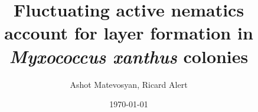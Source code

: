 \newenvironment{openissue}[1][Open]{%
  \setbeamercolor{block title alerted}{fg=white,bg=issuecolor}%
  \setbeamercolor{block body alerted}{fg=black,bg=issuecolor!10}%
  \setbeamerfont{itemize/enumerate body}{size=\small}%
  \setbeamerfont{itemize/enumerate subbody}{size=\footnotesize}%
  \begin{alertblock}{\small #1}\small}{\end{alertblock}}

\newenvironment{keyresult}[1][Key point]{%
  \setbeamercolor{block title example}{fg=white,bg=keycolor}%
  \setbeamercolor{block body example}{fg=black,bg=keycolor!8}%
  \begin{exampleblock}{\small #1}}{\end{exampleblock}}

\newcommand{\src}[1]{\gdef\framesrc{#1}}
\newcommand{\bridge}[1]{\par\vfill\hfill{\small\color{keycolor}\itshape$\rightarrow$~#1}\par}
\newcommand{\backuplink}[2]{\hyperlink{#1}{\beamergotobutton{#2}}}
\newcommand{\backto}[1]{\hyperlink{#1}{\beamerreturnbutton{back}}}

\title{Fluctuating active nematics account for layer formation in \textit{Myxococcus xanthus} colonies}
\author{Ashot Matevosyan, Ricard Alert}
\date{\today}
